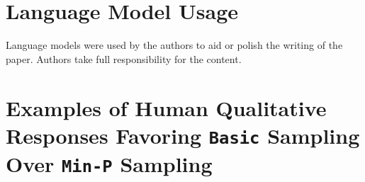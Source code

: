 


\section{Language Model Usage}
\label{app:sec:language_model_usage}

Language models were used by the authors to aid or polish the writing of the paper.
Authors take full responsibility for the content.

\clearpage


\section{Examples of Human Qualitative Responses Favoring \texttt{Basic} Sampling Over \texttt{Min-P} Sampling}
\label{app:sec:human_qual_responses}

